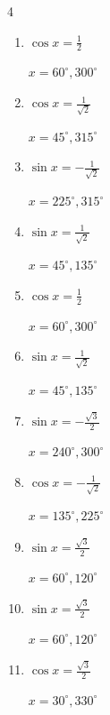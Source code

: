 \begin{multicols}{4}
\begin{enumerate}
  \item $\displaystyle \cos{x}  = \frac{1}{2}$

        $\displaystyle x = 60^{\circ} , 300^{\circ}$

  \item $\displaystyle \cos{x}  = \frac{1}{\sqrt{2}}$

        $\displaystyle x = 45^{\circ} , 315^{\circ}$

  \item $\displaystyle \sin{x}  = -\frac{1}{\sqrt{2}}$

        $\displaystyle x = 225^{\circ} , 315^{\circ}$

  \item $\displaystyle \sin{x}  = \frac{1}{\sqrt{2}}$

        $\displaystyle x = 45^{\circ} , 135^{\circ}$

\columnbreak %

\resetques

  \item $\displaystyle \cos{x}  = \frac{1}{2}$

        $\displaystyle x = 60^{\circ} , 300^{\circ}$

  \item $\displaystyle \sin{x}  = \frac{1}{\sqrt{2}}$

        $\displaystyle x = 45^{\circ} , 135^{\circ}$

  \item $\displaystyle \sin{x}  = -\frac{\sqrt{3}}{2}$

        $\displaystyle x = 240^{\circ} , 300^{\circ}$

  \item $\displaystyle \cos{x}  = -\frac{1}{\sqrt{2}}$

        $\displaystyle x = 135^{\circ} , 225^{\circ}$

  \item $\displaystyle \sin{x}  = \frac{\sqrt{3}}{2}$

        $\displaystyle x = 60^{\circ} , 120^{\circ}$

  \item $\displaystyle \sin{x}  = \frac{\sqrt{3}}{2}$

        $\displaystyle x = 60^{\circ} , 120^{\circ}$

  \item $\displaystyle \cos{x}  = \frac{\sqrt{3}}{2}$

        $\displaystyle x = 30^{\circ} , 330^{\circ}$


\end{enumerate}
\end{multicols}
